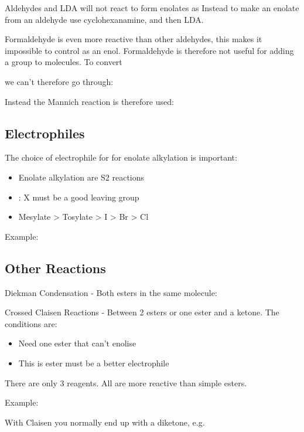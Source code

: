 
Aldehydes and LDA will not react to form enolates as 
Instead to make an enolate from an aldehyde use cyclohexanamine,  and then
LDA.


Formaldehyde is even more reactive than other aldehydes, this makes it impossible
to control as an enol. Formaldehyde is therefore not useful for adding a
 group to molecules. To convert


we can't therefore go through:


Instead the Mannich reaction is therefore used:


\subsection{Electrophiles}

The choice of electrophile for for enolate alkylation is important:
\begin{itemize}
  \item Enolate alkylation are S2 reactions
  \item {}: X must be a good leaving group
  \item Mesylate > Tosylate > I > Br > Cl
\end{itemize}


Example:


\subsection{Other Reactions}

Diekman Condensation - Both esters in the same molecule:


Crossed Claisen Reactions - Between 2 esters or one ester and a ketone. The
conditions are:
\begin{itemize}
  \item Need one ester that can't enolise
  \item This is ester must be a better electrophile
\end{itemize}

There are only 3 reagents. All are more reactive than simple esters.


Example:


With Claisen you normally end up with a diketone, e.g.


